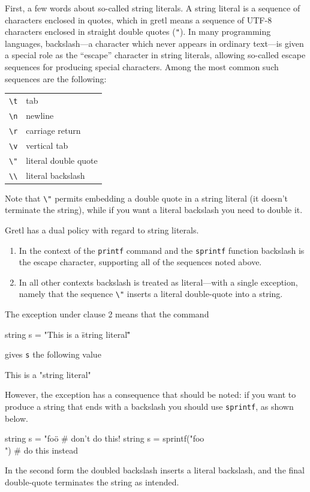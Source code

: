 First, a few words about so-called string literals. A string literal is
a sequence of characters enclosed in quotes, which in gretl means a
sequence of UTF-8 characters enclosed in straight double quotes
(\verb|"|). In many programming languages, backslash---a character which
never appears in ordinary text---is given a special role as the
``escape'' character in string literals, allowing so-called escape
sequences for producing special characters. Among the most common such
sequences are the following:
\begin{center}
\begin{tabular}{cl}
  \verb|\t| & tab \\
  \verb|\n| & newline \\
  \verb|\r| & carriage return \\
  \verb|\v| & vertical tab \\
  \verb|\"| & literal double quote \\
  \verb|\\| & literal backslash \\
\end{tabular}
\end{center}
Note that \verb|\"| permits embedding a double quote in a string
literal (it doesn't terminate the string), while if you want a literal
backslash you need to double it.

Gretl has a dual policy with regard to string literals.
\begin{enumerate}
\item In the context of the \texttt{printf} command and the
  \texttt{sprintf} function backslash is the escape character,
  supporting all of the sequences noted above.
\item In all other contexts backslash is treated as literal---with a
  single exception, namely that the sequence \verb|\"| inserts a literal
  double-quote into a string.
\end{enumerate}

The exception under clause 2 means that the command
\begin{code}
string s = "This is a \"string literal\""
\end{code}
gives \texttt{s} the following value
\begin{code}
This is a "string literal"
\end{code}

However, the exception has a consequence that should be noted: if you
want to produce a string that ends with a backslash you should use
\texttt{sprintf}, as shown below.
\begin{code}
string s = "foo\"           # don't do this!
string s = sprintf("foo\\") # do this instead
\end{code}
In the second form the doubled backslash inserts a literal backslash,
and the final double-quote terminates the string as intended.

